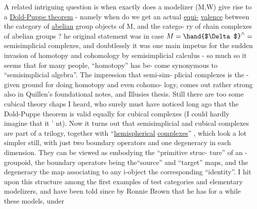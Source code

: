 A related intriguing question is when exactly does a modelizer (M,W)
give rise to a \uline{Dold-Puppe theorem}  -  namely when do we get an actual \uline{equi-}%
\uline{valence} between the category of \uline{abelian} group objects of M,  and the catego-%
ry of chain complexes of abelian groups ?  he original statement was in
case  $M = \hand{$\Delta$}^{\wedge} =$  semisimplicial complexes,  and doubtlessly it was one main
impetus for the sudden invasion of homotopy and cohomology by semisimplicial
calculus  -  so much so it seems that for many people,  ``homotopy'' has be-%
come synonymous to ``semisimplicial algebra''.  The impression that semi-sim-%
plicial complexes is the -given ground for doing homotopy and even cohomo-%
logy,  comes out rather strong also in Quillen's foundational notes, and
 Illusies thesis.  Still there are too some cubical theory chaps I heard,
who surely must have noticed long ago that the Dold-Puppe theorem is valid
equally  for cubical complexes (I could hardly imagine that it '
 nt).  Now it turns out that semisimplicial and cubical complexes are
part of a trilogy,  together with ``\uline{hemispherical} \uline{complexes}'' ,  which look
a lot simpler still,  with just two boundary operators and one degeneracy
in each dimension.  They can be viewed as  embodying the ``primitive struc-%
ture'' of an \hand{$\infty$}- groupoid,  the boundary operators being the``source'' and
``target'' maps,  and the degeneracy the map associating to any i-object the
corresponding ``identity''.  \hand{(} I hit upon this structure among the first
examples of test categories and elementary modelizers,  and have been told
since by Ronnie Brown that he has  for a while these models,  under

